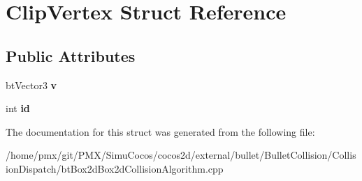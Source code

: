 \hypertarget{structClipVertex}{}\section{Clip\+Vertex Struct Reference}
\label{structClipVertex}
\subsection*{Public Attributes}
\begin{DoxyCompactItemize}
\item 
\mbox{\label{structClipVertex_aef0ba87278279d173dca2bc61df03f56}} 
bt\+Vector3 {\bfseries v}
\item 
\mbox{\label{structClipVertex_af1c55f4364142bb535e84db13c7eb632}} 
int {\bfseries id}
\end{DoxyCompactItemize}


The documentation for this struct was generated from the following file\+:\begin{DoxyCompactItemize}
\item 
/home/pmx/git/\+P\+M\+X/\+Simu\+Cocos/cocos2d/external/bullet/\+Bullet\+Collision/\+Collision\+Dispatch/bt\+Box2d\+Box2d\+Collision\+Algorithm.\+cpp\end{DoxyCompactItemize}

